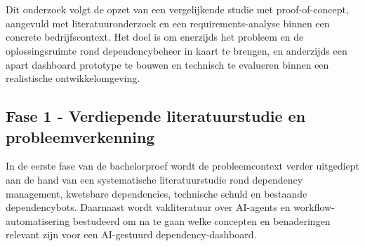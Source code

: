 
\chapter{}%
\label{ch:methodologie}


Dit onderzoek volgt de opzet van een vergelijkende studie met proof-of-concept, aangevuld met literatuuronderzoek en een requirements-analyse binnen een concrete bedrijfscontext. Het doel is om enerzijds het probleem en de oplossingsruimte rond dependencybeheer in kaart te brengen, en anderzijds een apart dashboard prototype te bouwen en technisch te evalueren binnen een realistische ontwikkelomgeving.

\section{Fase 1 - Verdiepende literatuurstudie en probleemverkenning}
\label{sec:fase1}

In de eerste fase van de bachelorproef wordt de probleemcontext verder uitgediept aan de hand van een systematische literatuurstudie rond dependency management, kwetsbare dependencies, technische schuld en bestaande dependencybots. Daarnaast wordt vakliteratuur over AI-agents en workflow-automatisering bestudeerd om na te gaan welke concepten en benaderingen relevant zijn voor een AI-gestuurd dependency-dashboard.

